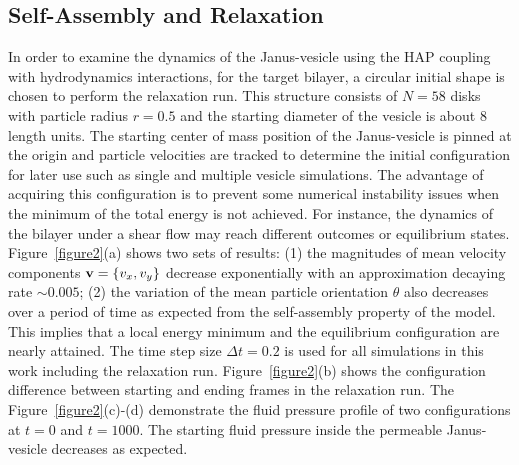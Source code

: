 \documentclass[lineno]{jfm}
\begin{document}
\subsection{Self-Assembly and Relaxation}

In order to examine the dynamics of the Janus-vesicle using the HAP coupling with hydrodynamics interactions, for the target bilayer, a circular initial shape is chosen to perform the relaxation run. 
This structure consists of $N=58$ disks with particle radius $r=0.5$ and the starting diameter of 
the vesicle is about $8$ length units.
The starting center of mass position of the Janus-vesicle is pinned at the origin and particle velocities are tracked to determine the initial configuration for later use such as single and multiple vesicle simulations. 
The advantage of acquiring this configuration is to prevent some numerical instability issues when the minimum of the total energy is not achieved. 
For instance, the dynamics of the bilayer under a shear flow may reach different outcomes or equilibrium states.
Figure~\ref{figure2}(a) shows two sets of results: (1) the magnitudes of mean velocity components 
${\bf v}=\{v_x,v_y\}$ decrease exponentially with an approximation decaying rate $\sim0.005$; (2) the variation of the mean particle orientation $\theta$ also decreases over a period of time as expected from the self-assembly property of the model. This implies that a local energy minimum and the equilibrium configuration are nearly attained. 
The time step size $\Delta t=0.2$ is used for all simulations in this work including the relaxation run.
Figure~\ref{figure2}(b) shows the configuration difference between starting and ending frames in the relaxation run. The Figure~\ref{figure2}(c)-(d) demonstrate the fluid pressure profile of two configurations at $t=0$ and $t=1000$. The starting fluid pressure inside the permeable Janus-vesicle decreases as expected.
\end{document}
